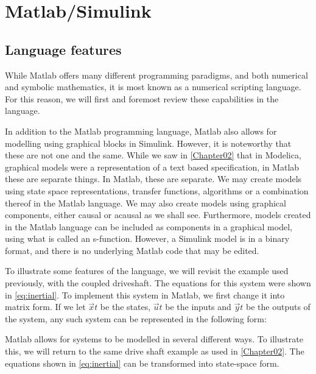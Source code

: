 \documentclass[\rootfolder/main.tex]{subfiles}
\begin{document}
\chapter{Matlab/Simulink} %

\label{Chapter03} %

\section{Language features}

While Matlab offers many different programming paradigms, and both numerical and symbolic mathematics, it is most known as a numerical scripting language.
For this reason, we will first and foremost review these capabilities in the language.

In addition to the Matlab programming language, Matlab also allows for modelling using graphical blocks in Simulink.
However, it is noteworthy that these are not one and the same.
While we saw in \cref{Chapter02} that in Modelica, graphical models were a representation of a text based specification, in Matlab these are separate things.
In Matlab, these are separate.
We may create models using state space representations, transfer functions, algorithms or a combination thereof in the Matlab language.
We may also create models using graphical components, either causal or acausal as we shall see.
Furthermore, models created in the Matlab language can be included as components in a graphical model, using what is called an s-function.
However, a Simulink model is in a binary format, and there is no underlying Matlab code that may be edited.

To illustrate some features of the language, we will revisit the example used previously, with the coupled driveshaft.
The equations for this system were shown in \cref{eq:inertial}.
To implement this system in Matlab, we first change it into matrix form.
If we let $\vec{x}{t}$ be the states, $\vec{u}{t}$ be the inputs and $\vec{y}{t}$ be the outputs of the system, any such system can be represented in the following form:


Matlab allows for systems to be modelled in several different ways.
To illustrate this, we will return to the same drive shaft example as used in \cref{Chapter02}.
The equations shown in \cref{eq:inertial} can be transformed into state-space form.
\end{document}
